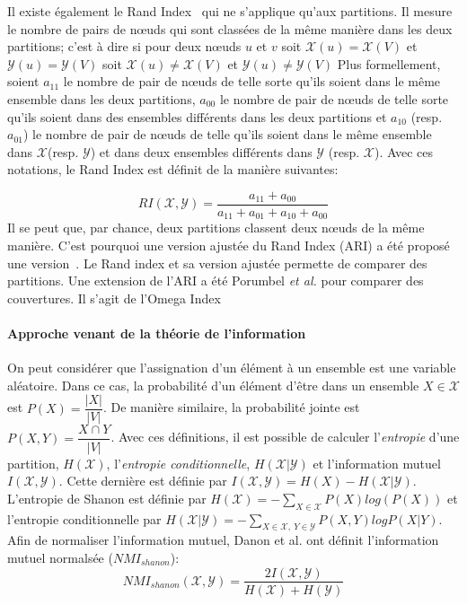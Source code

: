 Il existe également le Rand Index~\cite{Rand1971} qui ne s'applique qu'aux partitions.
Il mesure le nombre de pairs de n\oe uds qui sont classées de la même manière dans les deux partitions; c'est à dire si pour deux n\oe uds $u$ et $v$ soit $\mathcal{X}(u)=\mathcal{X}(V)$ et $\mathcal{Y}(u)=\mathcal{Y}(V)$ soit $\mathcal{X}(u)\neq \mathcal{X}(V)$ et $\mathcal{Y}(u)\neq \mathcal{Y}(V)$
Plus formellement, soient $a_{11}$ le nombre de pair de n\oe uds de telle sorte qu'ils soient dans le même ensemble dans les deux partitions, $a_{00}$ le nombre de pair de n\oe uds de telle sorte qu'ils soient dans des ensembles différents dans les deux partitions et $a_{10}$ (resp. $a_{01}$) le nombre de pair de n\oe uds de telle qu'ils soient dans le même ensemble dans $\mathcal{X}$(resp. $\mathcal{Y}$) et dans deux ensembles différents dans $\mathcal{Y}$ (resp. $\mathcal{X}$).
Avec ces notations, le Rand Index est définit de la manière suivantes:

\begin{equation}
RI(\mathcal{X},\mathcal{Y}) = \dfrac{a_{11} + a_{00}}{a_{11}+a_{01}+a_{10}+ a_{00}}
\end{equation}
Il se peut que, par chance, deux partitions classent deux n\oe uds de la même manière.
C'est pourquoi une version ajustée du Rand Index (ARI) a été proposé une version~\cite{Hubert1985}.
Le Rand index et sa version ajustée permette de comparer des partitions.
Une extension de l'ARI a été Porumbel \emph{et al.} pour comparer des couvertures.
Il s'agit de l'Omega Index~\cite{Porumbel2011}

\paragraph{Approche venant de la théorie de l'information}
On peut considérer que l'assignation d'un élément à un ensemble est une variable aléatoire.
Dans ce cas, la probabilité d'un élément d'être dans un ensemble $X \in \mathcal{X}$ est $P(X)= \dfrac{|X|}{|V|}$.
De manière similaire, la probabilité jointe est $P(X,Y) = \dfrac{X \cap Y}{|V|}$.
Avec ces définitions, il est possible de calculer l'\emph{entropie} d'une partition, $H(\mathcal{X})$, l'\emph{entropie conditionnelle}, $H(\mathcal{X}|\mathcal{Y})$ et l'information mutuel $I(\mathcal{X},\mathcal{Y})$.
Cette dernière est définie par $I(\mathcal{X}, \mathcal{Y}) = H(X) - H(\mathcal{X}|\mathcal{Y})$.
L'entropie de Shanon est définie par $H(\mathcal{X}) = - \sum_{X \in \mathcal{X}} P(X)log(P(X))$ et l'entropie conditionnelle par $H(\mathcal{X}|\mathcal{Y}) = -\sum_{X \in \mathcal{X},\ Y \in \mathcal{Y}} P(X, Y) log P(X|Y)$.
Afin de normaliser l'information mutuel, Danon et al. ont définit l'information mutuel normalsée ($NMI_{shanon}$):
\begin{equation}
 NMI_{shanon}(\mathcal{X},\mathcal{Y}) = \dfrac{2I(\mathcal{X},\mathcal{Y})}{H(\mathcal{X})+H(\mathcal{Y})}
\end{equation}


